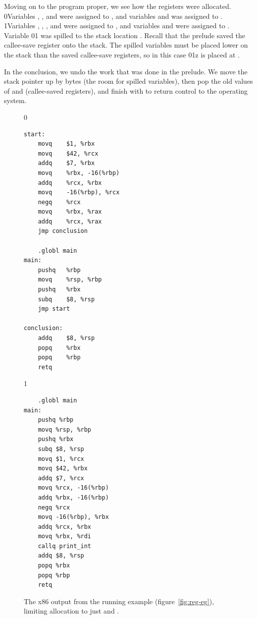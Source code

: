 \documentclass[7x10]{TimesAPriori_MIT}%
\def\racketEd{0}
\def\pythonEd{1}
\providecommand{\BookEdition}{1}
\let\edition\BookEdition
\newcommand{\racket}[1]{{\if\edition\racketEd{#1}\fi}}
\newcommand{\pythonColor}[0]{}
\newcommand{\python}[1]{{\if\edition\pythonEd\pythonColor #1\fi}}
\numberwithin{theorem}{chapter}
\numberwithin{definition}{chapter}
\numberwithin{equation}{chapter}
\begin{document}
Moving on to the program proper, we see how the registers were
allocated.
%
\racket{Variables , , and  were assigned to
  \code{rbx}, and variables  and \code{t} was assigned to .}
%
\python{Variables , , , and \code{tmp\_0}
  were assigned to \code{rcx}, and variables \code{w} and \code{tmp\_1}
  were assigned to \code{rbx}.}
%
Variable \racket{}\python{} was spilled to the stack
location .  Recall that the prelude saved the
callee-save register  onto the stack. The spilled variables
must be placed lower on the stack than the saved callee-save
registers, so in this case \racket{}\python{z} is placed at
.

In the conclusion, we undo the work that was
done in the prelude. We move the stack pointer up by  bytes
(the room for spilled variables), then pop the old values of
 and  (callee-saved registers), and finish with
 to return control to the operating system.

  
\begin{figure}[tbp]
\begin{minipage}{0.55\textwidth}
\begin{tcolorbox}[colback=white]
{\if\edition\racketEd
\begin{lstlisting}
start:
    movq	$1, %rbx
    movq	$42, %rcx
    addq	$7, %rbx
    movq	%rbx, -16(%rbp)
    addq	%rcx, %rbx
    movq	-16(%rbp), %rcx
    negq	%rcx
    movq	%rbx, %rax
    addq	%rcx, %rax
    jmp conclusion

    .globl main
main:
    pushq	%rbp
    movq	%rsp, %rbp
    pushq	%rbx
    subq	$8, %rsp
    jmp start

conclusion:
    addq	$8, %rsp
    popq	%rbx
    popq	%rbp
    retq
\end{lstlisting}
\fi}
{\if\edition\pythonEd\pythonColor
\begin{lstlisting}
    .globl main
main:
    pushq %rbp
    movq %rsp, %rbp
    pushq %rbx
    subq $8, %rsp
    movq $1, %rcx
    movq $42, %rbx
    addq $7, %rcx
    movq %rcx, -16(%rbp)
    addq %rbx, -16(%rbp)
    negq %rcx
    movq -16(%rbp), %rbx
    addq %rcx, %rbx
    movq %rbx, %rdi
    callq print_int
    addq $8, %rsp
    popq %rbx
    popq %rbp
    retq
\end{lstlisting}
\fi}
\end{tcolorbox}
\end{minipage}
\caption{The x86 output from the running example
  (figure~\ref{fig:reg-eg}), limiting allocation to just 
  and .}
\label{fig:running-example-x86}
\end{figure}
\end{document}
